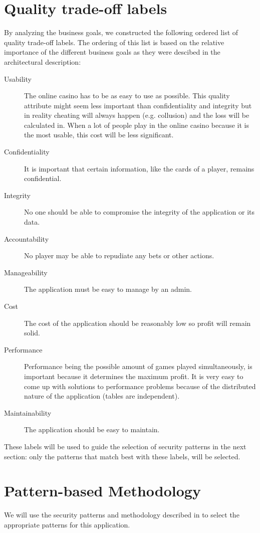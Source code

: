\documentclass[a4paper,11pt]{report}
\begin{document}
\section{Quality trade-off labels}
\label{labels}
By analyzing the business goals, we constructed the following ordered list of quality trade-off labels. The ordering of this list is based on the relative importance of the different business goals as they were descibed in the architectural description:
\begin{description}
\item[Usability] The online casino has to be as easy to use as possible.
This quality attribute might seem less important than confidentiality and
integrity but in reality cheating will always happen (e.g. collusion) and
the loss will be calculated in. When a lot of people play in the online
casino because it is the most usable, this cost will be less significant.
\item[Confidentiality] It is important that certain information, like the cards of a player, remains
confidential.
\item[Integrity] No one should be able to compromise the integrity of the application or its data.
\item[Accountability] No player may be able to repudiate any bets or other actions.
\item[Manageability] The application must be easy to manage by an admin.
\item[Cost] The cost of the application should be reasonably low so profit will remain solid.
\item[Performance] Performance being the possible amount of games played simultaneously, is important because it
determines the maximum profit. It is very easy to come up with solutions
to performance problems because of the distributed nature of the
application (tables are independent).
\item[Maintainability] The application should be easy to maintain.
\end{description}
These labels will be used to guide the selection of security patterns in the next section: only the patterns that match best with these labels, will be selected.

\section{Pattern-based Methodology}
We will use the security patterns and methodology described in \cite{yskout} to select the appropriate patterns
for this application.
\end{document}
